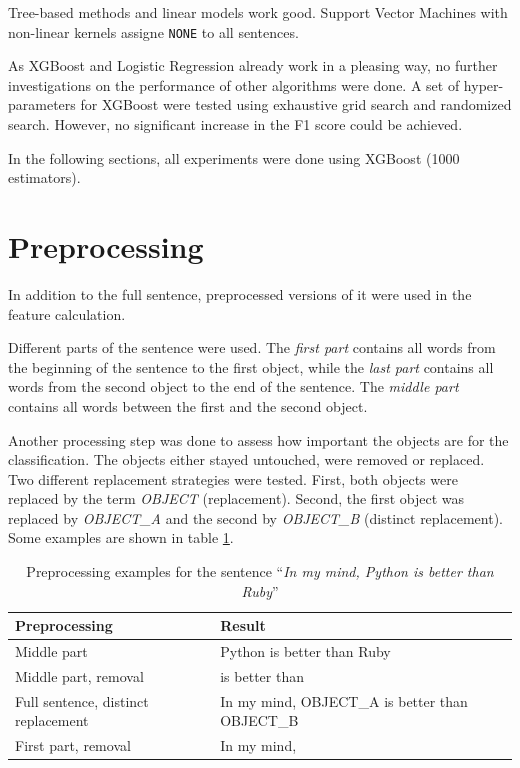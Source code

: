 Tree-based methods and linear models work good. Support Vector Machines with non-linear kernels assigne \texttt{NONE} to all sentences.

As XGBoost and Logistic Regression already work in a pleasing way, no further investigations on the performance of other algorithms were done. A set of hyper-parameters for XGBoost were tested using exhaustive grid search and randomized search. However, no significant increase in the F1 score could be achieved.

In the following sections, all experiments were done using XGBoost (1000 estimators).


\section{Preprocessing}
In addition to the full sentence, preprocessed versions of it were used in the feature calculation.

Different parts of the sentence were used. The \emph{first part} contains all words from the beginning of the sentence to the first object, while the \emph{last part} contains all words from the second object to the end of the sentence. The \emph{middle part} contains all words between the first and the second object.

Another processing step was done to assess how important the objects are for the classification. The objects either stayed untouched, were removed or replaced. Two different replacement strategies were tested. First, both objects were replaced by the term \emph{OBJECT} (replacement). Second, the first object was replaced by \emph{OBJECT\_A} and the second by \emph{OBJECT\_B} (distinct replacement). Some examples are shown in table \ref{preprocessing_example}.

\begin{table}[h]
\centering

\caption{Preprocessing examples for the sentence \enquote{\emph{In my mind, Python is better than Ruby}}}
\label{preprocessing_example}
\begin{tabularx}{\linewidth}{lX}
\toprule
Preprocessing & Result \\ \midrule
Middle part & Python is better than Ruby \\
Middle part, removal & is better than \\
Full sentence, distinct replacement &In my mind, OBJECT\_A is better than OBJECT\_B \\
First part, removal & In my mind, \\
\bottomrule
\end{tabularx}

\end{table}


